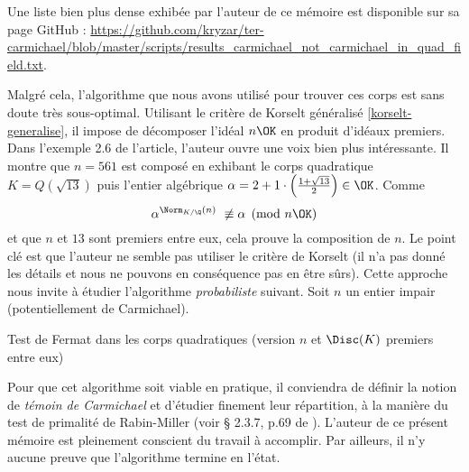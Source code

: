 \begin{Complement}
	Une liste bien plus dense exhibée par l'auteur de ce mémoire est disponible sur sa page GitHub : \url{https://github.com/kryzar/ter-carmichael/blob/master/scripts/results_carmichael_not_carmichael_in_quad_field.txt}. \\
\end{Complement}

Malgré cela, l'algorithme que nous avons utilisé pour trouver ces corps est sans doute très sous-optimal. Utilisant le critère de Korselt généralisé \ref{korselt-generalise}, il impose de décomposer l'idéal $n\OK$ en produit d'idéaux premiers. Dans l'exemple 2.6 de l'article, l'auteur ouvre une voix bien plus intéressante. Il montre que $n = 561$ est composé en exhibant le corps quadratique $K = Q(\sqrt{13})$ puis l'entier algébrique $\alpha = 2 + 1\cdot \left(\frac{1 + \sqrt{13}}{2}\right) \in \OK$. Comme $$\alpha^{\Norm_{K/\Q}(n)} \not \equiv \alpha \pmod{n\OK}$$ et que $n$ et $13$ sont premiers entre eux, cela prouve la composition de $n$. Le point clé est que l'auteur ne semble pas utiliser le critère de Korselt (il n'a pas donné les détails et nous ne pouvons en conséquence pas en être sûrs). Cette approche nous invite à étudier l'algorithme \emph{probabiliste} suivant. Soit $n$ un entier impair (potentiellement de Carmichael).

\vspace{1em}
\begin{algorithm}[H]\label{algo-quadratique-faible}\label{algo-1}
\caption{Test de Fermat dans les corps quadratiques (version $n$ et $\Disc(K)$ premiers entre eux)}
\end{algorithm}
\vspace{1em}

Pour que cet algorithme soit viable en pratique, il conviendra de définir la notion de \textit{témoin de Carmichael} et d'étudier finement leur répartition, à la manière du test de primalité de Rabin-Miller (voir § 2.3.7, p.69 de \cite{Demazure}). L'auteur de ce présent mémoire est pleinement conscient du travail à accomplir. Par ailleurs, il n'y aucune preuve que l'algorithme termine en l'état. \\

